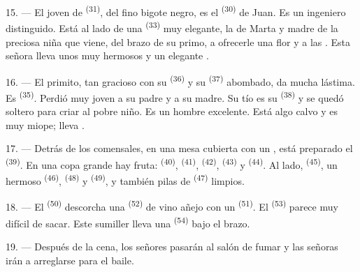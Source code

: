 15. --- El joven de  \textsuperscript{(31)}, del fino bigote negro, es
el  \textsuperscript{(30)} de Juan. Es un ingeniero distinguido. Está
al lado de una  \textsuperscript{(33)} muy elegante, la
 de Marta y madre de la preciosa niña que viene, del
brazo de su primo, a ofrecerle una flor y a  las
. Esta señora lleva unos  muy
hermosos y un elegante .

16. --- El primito, tan gracioso con su  \textsuperscript{(36)} y su
 \textsuperscript{(37)} abombado, da mucha lástima. Es
 \textsuperscript{(35)}. Perdió muy joven a su padre y a su madre.
Su tío es su  \textsuperscript{(38)} y se quedó soltero para criar al
pobre niño. Es un hombre excelente. Está algo calvo y es muy miope; lleva
.

\VUsaut{2.4mm}
\VUsaut{3.0mm}

17. --- Detrás de los comensales, en una mesa cubierta con un
, está preparado el  \textsuperscript{(39)}. En una
copa grande hay fruta:  \textsuperscript{(40)},
 \textsuperscript{(41)},  \textsuperscript{(42)},
 \textsuperscript{(43)} y  \textsuperscript{(44)}. Al lado,
 \textsuperscript{(45)}, un hermoso  \textsuperscript{(46)},
 \textsuperscript{(48)} y  \textsuperscript{(49)}, y
también pilas de  \textsuperscript{(47)} limpios.

18. --- El  \textsuperscript{(50)} descorcha una 
\textsuperscript{(52)} de vino añejo con un  \textsuperscript{(51)}. El
 \textsuperscript{(53)} parece muy difícil de sacar. Este sumiller
lleva una  \textsuperscript{(54)} bajo el brazo.

19. --- Después de la cena, los señores pasarán al salón de fumar y las
señoras irán a arreglarse para el baile.

\VUsaut{5.0mm}
\VUsaut{1.6mm}
\VUsaut{2.6mm}

\VUsaut{3.0mm}

